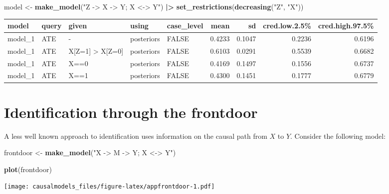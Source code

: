 \documentclass[
  12pt,
]{book}
\newenvironment{Shaded}{\begin{snugshade}}{\end{snugshade}}
\newcommand{\FunctionTok}[1]{\textcolor[rgb]{0.13,0.29,0.53}{\textbf{#1}}}
\newcommand{\NormalTok}[1]{#1}
\newcommand{\OtherTok}[1]{\textcolor[rgb]{0.56,0.35,0.01}{#1}}
\newcommand{\SpecialCharTok}[1]{\textcolor[rgb]{0.81,0.36,0.00}{\textbf{#1}}}
\newcommand{\StringTok}[1]{\textcolor[rgb]{0.31,0.60,0.02}{#1}}
\begin{document}
\begin{Shaded}
\begin{Highlighting}[]
\NormalTok{model }\OtherTok{\textless{}{-}} \FunctionTok{make\_model}\NormalTok{(}\StringTok{"Z {-}\textgreater{} X {-}\textgreater{} Y; X \textless{}{-}\textgreater{} Y"}\NormalTok{)  }\SpecialCharTok{|\textgreater{}}
         \FunctionTok{set\_restrictions}\NormalTok{(}\FunctionTok{decreasing}\NormalTok{(}\StringTok{"Z"}\NormalTok{, }\StringTok{"X"}\NormalTok{)) }
\end{Highlighting}
\end{Shaded}

\begin{tabular}{l|l|l|l|l|r|r|r|r}
\hline
model & query & given & using & case\_level & mean & sd & cred.low.2.5\% & cred.high.97.5\%\\
\hline
model\_1 & ATE & - & posteriors & FALSE & 0.4233 & 0.1047 & 0.2236 & 0.6196\\
\hline
model\_1 & ATE & X[Z=1] > X[Z=0] & posteriors & FALSE & 0.6103 & 0.0291 & 0.5539 & 0.6682\\
\hline
model\_1 & ATE & X==0 & posteriors & FALSE & 0.4169 & 0.1497 & 0.1556 & 0.6737\\
\hline
model\_1 & ATE & X==1 & posteriors & FALSE & 0.4300 & 0.1451 & 0.1777 & 0.6779\\
\hline
\end{tabular}

\hypertarget{identification-through-the-frontdoor}{%
\section{Identification through the frontdoor}\label{identification-through-the-frontdoor}}

A less well known approach to identification uses information on the causal path from \(X\) to \(Y\). Consider the following model:

\begin{Shaded}
\begin{Highlighting}[]
\NormalTok{frontdoor }\OtherTok{\textless{}{-}} \FunctionTok{make\_model}\NormalTok{(}\StringTok{"X {-}\textgreater{} M {-}\textgreater{} Y; X \textless{}{-}\textgreater{} Y"}\NormalTok{) }

\FunctionTok{plot}\NormalTok{(frontdoor)}
\end{Highlighting}
\end{Shaded}

\texttt{[image: causalmodels\_files/figure-latex/appfrontdoor-1.pdf]}
\end{document}

